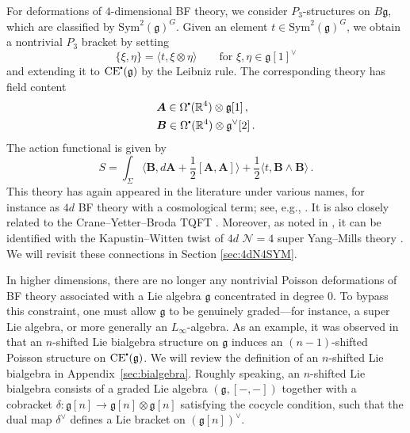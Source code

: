 \documentclass[11pt]{article}
\newcommand{\R}{\mathbb{R}}
\newcommand\sbullet[1][.5]{\mathbin{\vcenter{\hbox{\scalebox{#1}{$\bullet$}}}}}
\numberwithin{equation}{section}
\begin{document}
For deformations of $4$-dimensional BF theory, we consider $P_3$-structures on $B\mathfrak{g}$, which are classified by $\mathrm{Sym}^2(\mathfrak{g})^{G}$. Given an element $t \in \mathrm{Sym}^2(\mathfrak{g})^{G}$, we obtain a nontrivial $P_3$ bracket by setting
\begin{equation}\label{eq:P3_pair}
	\{\xi,\eta\} = \langle t,\xi\otimes\eta \rangle \quad\quad \text{for } \xi,\eta \in \mathfrak{g}[1]^{\vee}
\end{equation}
and extending it to $\mathrm{CE}^{\sbullet}(\mathfrak{g})$ by the Leibniz rule. The corresponding theory has field content
\begin{equation}
	\begin{aligned}
		&\boldsymbol{A}\in \Omega^{\sbullet}(\R^4)\otimes \mathfrak{g}[1]\,,\\
		&\boldsymbol{B}\in \Omega^{\sbullet}(\R^4)\otimes\mathfrak{g}^{\vee}[2]\,.
	\end{aligned}
\end{equation}
The action functional is given by
\begin{equation}
	S  = \int_{\Sigma}\langle \boldsymbol{B},d\boldsymbol{A} + \frac{1}{2}[\boldsymbol{A},\boldsymbol{A}]\rangle + \frac{1}{2}\langle t,\boldsymbol{B}\wedge\boldsymbol{B}\rangle\,.
\end{equation}
This theory has again appeared in the literature under various names, for instance as $4d$ BF theory with a cosmological term; see, e.g., \cite{Cattaneo:1995tw,Baez:1995ph}. It is also closely related to the Crane--Yetter--Broda TQFT \cite{Crane:1994ji}. Moreover, as noted in \cite{costello2013notes}, it can be identified with the Kapustin--Witten twist of $4d$ $\mathcal{N}=4$ super Yang--Mills theory \cite{Kapustin:2006pk}. We will revisit these connections in Section \ref{sec:4dN4SYM}.


In higher dimensions, there are no longer any nontrivial Poisson deformations of BF theory associated with a Lie algebra $\mathfrak{g}$ concentrated in degree $0$. To bypass this constraint, one must allow $\mathfrak{g}$ to be genuinely graded---for instance, a super Lie algebra, or more generally an $L_\infty$-algebra. As an example, it was observed in \cite{pimenov2015shifted} that an $n$-shifted Lie bialgebra structure on $\mathfrak{g}$ induces an $(n-1)$-shifted Poisson structure on $\mathrm{CE}^{\sbullet}(\mathfrak{g})$. We will review the definition of an $n$-shifted Lie bialgebra in Appendix~\ref{sec:bialgebra}. Roughly speaking, an $n$-shifted Lie bialgebra consists of a graded Lie algebra $(\mathfrak{g},[-,-])$ together with a cobracket $\delta: \mathfrak{g}[n] \to \mathfrak{g}[n]\otimes \mathfrak{g}[n]$ satisfying the cocycle condition, such that the dual map $\delta^\vee$ defines a Lie bracket on $(\mathfrak{g}[n])^{\vee}$.
\end{document}
